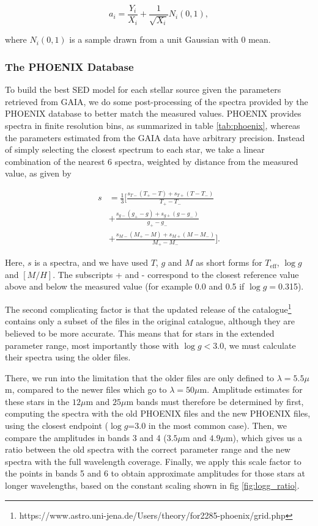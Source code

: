 \documentclass{aa}
\begin{document}
\begin{equation}
a_i = \frac{Y_i}{X_i} + \frac{1}{\sqrt{X_i}} N_i(0,1),
\end{equation}

where $N_i(0,1)$ is a sample drawn from a unit Gaussian with 0 mean.

\subsubsection{The PHOENIX Database}
\label{sec:phoenix}

To build the best SED model for each stellar source given the parameters retrieved from GAIA, we do some post-processing of the spectra provided by the PHOENIX database to better match the measured values. PHOENIX provides spectra in finite resolution bins, as summarized in table \ref{tab:phoenix}, whereas the parameters estimated from the GAIA data have arbitrary precision. Instead of simply selecting the closest spectrum to each star, we take a linear combination of the nearest 6 spectra, weighted by distance from the measured value, as given by 


\begin{align}
s &= \frac{1}{3}\bigg[\frac{s_{T-} (T_{+} - T) + s_{T+} (T - T_{-})}{T_{+} - T_{-}} \nonumber \\ 
&+ \frac{s_{g-} (g_{+} - g) + s_{g+} (g - g_{-})}{g_{+} - g_{-}} \nonumber \\
&+ \frac{s_{M-} (M_{+} - M) + s_{M+} (M - M_{-})}{M_{+} - M_{-}}\bigg].
\end{align}

Here, $s$ is a spectra, and we have used $T$, $g$ and $M$ as short forms for $T_{\mathrm{eff}}$, $\log g$ and $[M/H]$. The subscripts + and - correspond to the closest reference value above and below the measured value (for example 0.0 and 0.5 if $\log g=$0.315). 

The second complicating factor is that the updated release of the catalogue\footnote{https://www.astro.uni-jena.de/Users/theory/for2285-phoenix/grid.php} contains only a subset of the files in the original catalogue, although they are believed to be more accurate. This means that for stars in the extended parameter range, most importantly those with $\log g<$3.0, we must calculate their spectra using the older files. 

There, we run into the limitation that the older files are only defined to $\lambda=5.5\mu$m, compared to the newer files which go to $\lambda=50\mu$m. Amplitude estimates for these stars in the $12\mu$m and $25\mu$m bands must therefore be determined by first, computing the spectra with the old PHOENIX files and the new PHOENIX files, using the closest endpoint ($\log g$=3.0 in the most common case). Then, we compare the amplitudes in bands 3 and 4 ($3.5\mu$m and $4.9\mu$m), which gives us a ratio between the old spectra with the correct parameter range and the new spectra with the full wavelength coverage. Finally, we apply this scale factor to the points in bands 5 and 6 to obtain approximate amplitudes for those stars at longer wavelengths, based on the constant scaling shown in fig \ref{fig:logg_ratio}.
\end{document}
